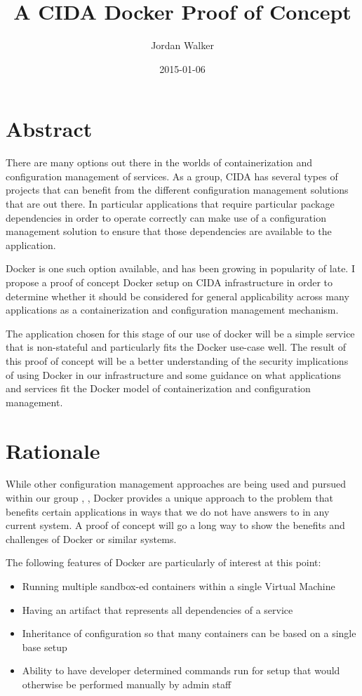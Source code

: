 \documentclass[twocolumn]{article}
\title{A CIDA Docker Proof of Concept}
\author{Jordan Walker}
\date{2015-01-06}
\begin{document}
\maketitle

\section{Abstract}

There are many options out there in the worlds of containerization and configuration management of services.
As a group, CIDA \cite{cida} has several types of projects that can benefit from the different configuration management solutions that are out there.
In particular applications that require particular package dependencies in order to operate correctly can make use of a configuration management solution to ensure that those dependencies are available to the application.

\par
Docker \cite{dockerintro} is one such option available, and has been growing in popularity of late.
I propose a proof of concept Docker setup on CIDA infrastructure in order to determine whether it should be considered for general applicability across many applications as a containerization and configuration management mechanism.

\par
The application chosen for this stage of our use of docker will be a simple service that is non-stateful and particularly fits the Docker use-case well.
The result of this proof of concept will be a better understanding of the security implications of using Docker in our infrastructure and some guidance on what applications and services fit the Docker model of containerization and configuration management.

\section{Rationale}

While other configuration management approaches are being used and pursued within our group \cite{cfengine}, \cite{ansible}, \cite{chef} Docker provides a unique approach to the problem that benefits certain applications in ways that we do not have answers to in any current system.
A proof of concept will go a long way to show the benefits and challenges of Docker or similar systems.

\par
The following features of Docker are particularly of interest at this point:
\begin{itemize}
  \item Running multiple sandbox-ed containers within a single Virtual Machine
  \item Having an artifact that represents all dependencies of a service
  \item Inheritance of configuration so that many containers can be based on a single base setup
  \item Ability to have developer determined commands run for setup that would otherwise be performed manually by admin staff
\end{itemize}
\end{document}
